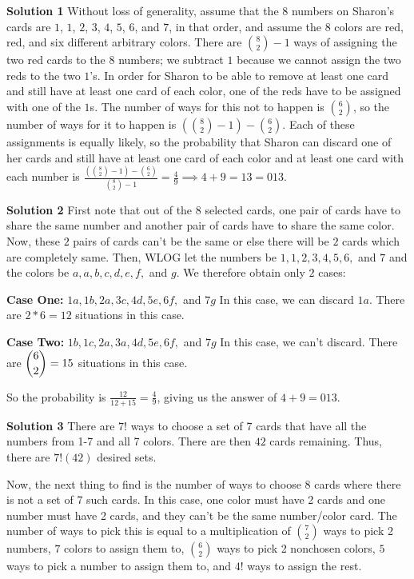 \documentclass[a4paper,11pt]{article}
\begin{document}
\textbf{Solution 1}
Without loss of generality, assume that the $8$ numbers on Sharon's cards are $1$, $1$, $2$, $3$, $4$, $5$, $6$, and $7$, in that order, and assume the $8$ colors are red, red, and six different arbitrary colors. There are ${8\choose2}-1$ ways of assigning the two red cards to the $8$ numbers; we subtract $1$ because we cannot assign the two reds to the two $1$'s. In order for Sharon to be able to remove at least one card and still have at least one card of each color, one of the reds have to be assigned with one of the $1$s. The number of ways for this not to happen is ${6\choose2}$, so the number of ways for it to happen is $\left({8\choose2}-1\right)-{6\choose2}$. Each of these assignments is equally likely, so the probability that Sharon can discard one of her cards and still have at least one card of each color and at least one card with each number is $\frac{\left({8\choose2}-1\right)-{6\choose2}}{{8\choose2}-1}=\frac{4}{9} \implies 4 + 9 = 13 = \boxed{013}$.

\textbf{Solution 2}
First note that out of the $8$ selected cards, one pair of cards have to share the same number and another pair of cards have to share the same color. Now, these $2$ pairs of cards can't be the same or else there will be $2$ cards which are completely same. Then, WLOG let the numbers be $1,1,2,3,4,5,6,$ and $7$ and the colors be $a,a,b,c,d,e,f,$ and $g$. We therefore obtain only $2$ cases:

\textbf{Case One:} $1a,1b,2a,3c,4d,5e,6f,$ and $7g$ In this case, we can discard $1a$. There are $2*6=12$ situations in this case.

\textbf{Case Two:} $1b,1c,2a,3a,4d,5e,6f,$ and $7g$ In this case, we can't discard. There are $\dbinom{6}{2}=15$ situations in this case.

So the probability is $\frac{12}{12+15}=\frac{4}{9}$, giving us the answer of $4+9=\boxed{013}$.

\textbf{Solution 3}
There are $7!$ ways to choose a set of 7 cards that have all the numbers from 1-7 and all 7 colors. There are then $42$ cards remaining. Thus, there are $7!(42)$ desired sets.

Now, the next thing to find is the number of ways to choose 8 cards where there is not a set of 7 such cards. In this case, one color must have 2 cards and one number must have 2 cards, and they can't be the same number/color card. The number of ways to pick this is equal to a multiplication of $\binom{7}{2}$ ways to pick 2 numbers, $7$ colors to assign them to, $\binom{6}{2}$ ways to pick 2 nonchosen colors, $5$ ways to pick a number to assign them to, and $4!$ ways to assign the rest.
\end{document}
